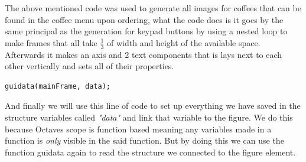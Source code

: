 \documentclass[a4paper, 10pt]{article}
\begin{document}
		\vspace{3mm}
		\noindent The above mentioned code was used to generate all images for coffees that can be found in the coffee menu upon ordering, what the code does is it goes by the same principal as the generation for keypad buttons by using a nested loop to
		make frames that all take $\frac{1}{3}$ of width and height of the available space. Afterwards it makes an axis and 2 text components that is lays next to each other vertically and sets all of their properties. \\
		\hline
		
		\begin{lstlisting}
guidata(mainFrame, data);
		\end{lstlisting}

		\noindent And finally we will use this line of code to set up everything we have saved in the structure variables called \emph{"data"} and link that variable to the figure. We do this because Octaves scope is function based meaning any variables made
		in a function is \emph{only} visible in the said function. But by doing this we can use the function guidata again to read the structure we connected to the figure element.
\end{document}
